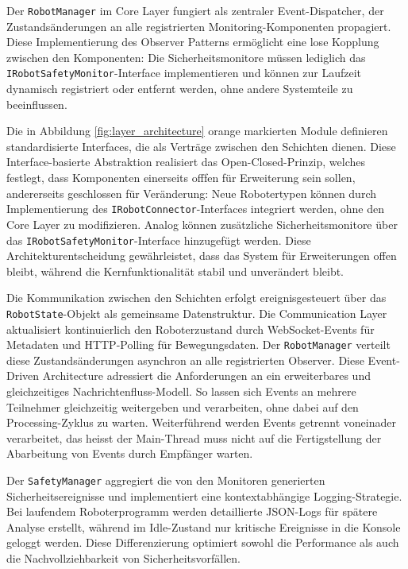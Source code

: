 Der \texttt{RobotManager} im Core Layer fungiert als zentraler
Event-Dispatcher, der Zustandsänderungen an alle registrierten
Monitoring-Komponenten propagiert. Diese Implementierung des Observer Patterns
ermöglicht eine lose Kopplung zwischen den
Komponenten: Die Sicherheitsmonitore müssen
lediglich das \texttt{IRobotSafetyMonitor}-Interface implementieren und können
zur Laufzeit dynamisch registriert oder entfernt werden, ohne andere Systemteile
zu beeinflussen.

Die in Abbildung \ref{fig:layer_architecture}
orange markierten Module definieren standardisierte Interfaces, die als Verträge
zwischen den Schichten dienen. Diese Interface-basierte Abstraktion realisiert
das Open-Closed-Prinzip, welches festlegt, dass Komponenten einerseits offfen
für Erweiterung sein sollen, andererseits geschlossen für
Veränderung: Neue Robotertypen können durch Implementierung
des \texttt{IRobotConnector}-Interfaces integriert werden, ohne den Core Layer
zu modifizieren. Analog können zusätzliche Sicherheitsmonitore über das
\texttt{IRobotSafetyMonitor}-Interface hinzugefügt werden. Diese
Architekturentscheidung gewährleistet, dass das System für Erweiterungen offen
bleibt, während die Kernfunktionalität stabil und unverändert bleibt.


Die Kommunikation zwischen den Schichten erfolgt ereignisgesteuert über das
\texttt{RobotState}-Objekt als gemeinsame Datenstruktur. Die Communication Layer
aktualisiert kontinuierlich den Roboterzustand durch WebSocket-Events für
Metadaten und HTTP-Polling für Bewegungsdaten. Der \texttt{RobotManager}
verteilt diese Zustandsänderungen asynchron an alle registrierten Observer.
Diese Event-Driven Architecture adressiert die Anforderungen an ein
erweiterbares und gleichzeitiges Nachrichtenfluss-Modell. So lassen sich Events
an mehrere Teilnehmer gleichzeitig weitergeben und verarbeiten, ohne dabei auf
den Processing-Zyklus zu warten. Weiterführend werden Events getrennt voneinader
verarbeitet, das heisst der Main-Thread muss nicht auf die Fertigstellung der
Abarbeitung von Events durch Empfänger warten.


Der \texttt{SafetyManager} aggregiert die von den Monitoren generierten
Sicherheitsereignisse und implementiert eine kontextabhängige Logging-Strategie.
Bei laufendem Roboterprogramm werden detaillierte JSON-Logs für spätere Analyse
erstellt, während im Idle-Zustand nur kritische Ereignisse in die Konsole
geloggt werden. Diese Differenzierung optimiert sowohl die Performance als auch
die Nachvollziehbarkeit von Sicherheitsvorfällen.



